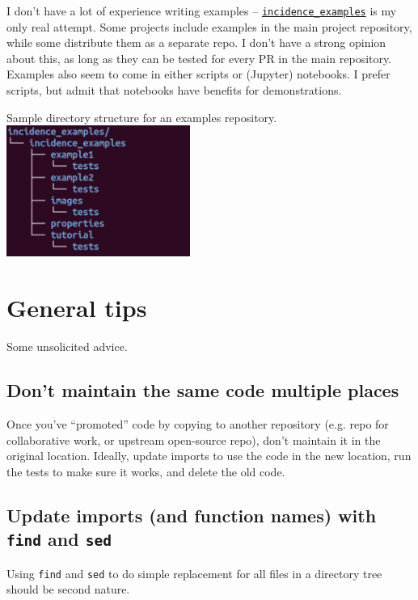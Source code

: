 \documentclass{article}
\begin{document}
I don't have a lot of experience writing examples --
\href{https://github.com/Robbybp/incidence_examples}{\texttt{incidence\_examples}}
is my only real attempt. Some projects include examples in the main project
repository, while some distribute them as a separate repo.
I don't have a strong opinion about this, as long as they can be tested
for every PR in the main repository.
Examples also seem to come in either scripts or (Jupyter) notebooks.
I prefer scripts, but admit that notebooks have benefits for demonstrations.

\begin{center}
  Sample directory structure for an examples repository.\\
  \includegraphics[width=6cm]{incidence_examples_tree_small}
\end{center}

\section{General tips}
Some unsolicited advice.

\subsection{Don't maintain the same code multiple places}
Once you've ``promoted'' code by copying to another repository
(e.g. repo for collaborative work, or upstream open-source repo),
don't maintain it in the original location.
Ideally, update imports to use the code in the new location,
run the tests to make sure it works, and delete the old code.

\subsection{Update imports (and function names) with
\texttt{find} and \texttt{sed}}
Using \texttt{find} and \texttt{sed} to do simple replacement
for all files in a directory tree should be second nature.
\end{document}
